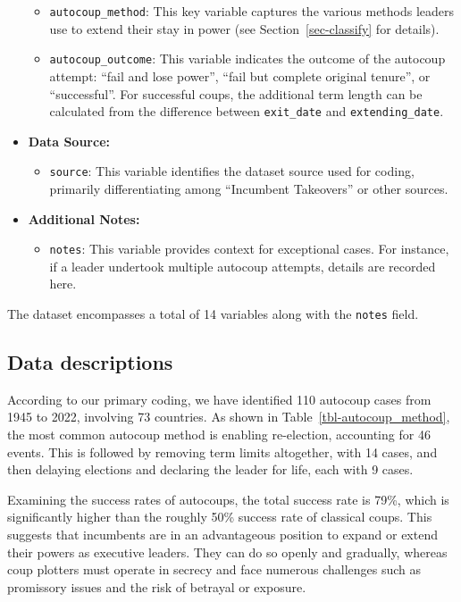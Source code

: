 \documentclass[
  12pt,
]{report}
\providecommand{\tightlist}{%
  \setlength{\itemsep}{0pt}\setlength{\parskip}{0pt}}\usepackage{longtable,booktabs,array}
\begin{document}
\begin{itemize}
  \begin{itemize}
  \item
    \texttt{autocoup\_method}: This key variable captures the various
    methods leaders use to extend their stay in power (see
    Section~\ref{sec-classify} for details).
  \item
    \texttt{autocoup\_outcome}: This variable indicates the outcome of
    the autocoup attempt: ``fail and lose power'', ``fail but complete
    original tenure'', or ``successful''. For successful coups, the
    additional term length can be calculated from the difference between
    \texttt{exit\_date} and \texttt{extending\_date}.
  \end{itemize}
\item
  \textbf{Data Source:}

  \begin{itemize}
  \tightlist
  \item
    \texttt{source}: This variable identifies the dataset source used
    for coding, primarily differentiating among ``Incumbent Takeovers''
    or other sources.
  \end{itemize}
\item
  \textbf{Additional Notes:}

  \begin{itemize}
  \tightlist
  \item
    \texttt{notes}: This variable provides context for exceptional
    cases. For instance, if a leader undertook multiple autocoup
    attempts, details are recorded here.
  \end{itemize}
\end{itemize}

The dataset encompasses a total of 14 variables along with the
\texttt{notes} field.

\subsection{Data descriptions}\label{data-descriptions}

According to our primary coding, we have identified 110 autocoup cases
from 1945 to 2022, involving 73 countries. As shown in
Table~\ref{tbl-autocoup_method}, the most common autocoup method is
enabling re-election, accounting for 46 events. This is followed by
removing term limits altogether, with 14 cases, and then delaying
elections and declaring the leader for life, each with 9 cases.

Examining the success rates of autocoups, the total success rate is
79\%, which is significantly higher than the roughly 50\% success rate
of classical coups. This suggests that incumbents are in an advantageous
position to expand or extend their powers as executive leaders. They can
do so openly and gradually, whereas coup plotters must operate in
secrecy and face numerous challenges such as promissory issues and the
risk of betrayal or exposure.
\end{document}
